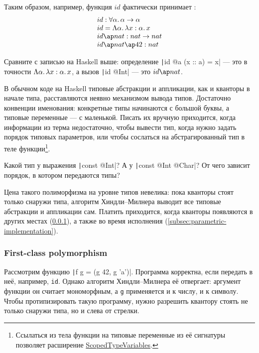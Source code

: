 Таким образом, например, функция $id$ фактически принимает :
\[
    \begin{array}{ll}
        id : \forall\alpha\ldotp\alpha\to\alpha            \\
        id = \Lambda\alpha\ldotp\lambda x : \alpha\ldotp x \\
        id \ap nat : nat \to nat                           \\
        id\ap nat \ap 42 : nat
    \end{array}
\]

Сравните с записью на Haskell выше: определение \texttt|id @a (x :: a) = x| --- это в точности $\Lambda\alpha\ldotp\lambda x : \alpha\ldotp x$, а вызов \texttt|id @Int| --- это $id\ap nat$.

В обычном коде на Haskell типовые абстракции и аппликации, как и кванторы в начале типа, расставляются неявно механизмом вывода типов.
Достаточно конвенции именования: конкретные типы начинаются с большой буквы, а типовые переменные --- с маленькой.
Писать их вручную приходится, когда информации из терма недостаточно, чтобы вывести тип, когда нужно задать порядок типовых параметров, или чтобы сослаться на абстрагированный тип в теле функции\footnote{Ссылаться из тела функции на типовые переменные из её сигнатуры позволяет расширение \href{https://downloads.haskell.org/ghc/latest/docs/users_guide/exts/scoped_type_variables.html\#extension-ScopedTypeVariables}{ScopedTypeVariables}.}.

\begin{task}
    Какой тип у выражения \texttt|const @Int|?
    А у \texttt|const @Int @Char|?
    От чего зависит порядок, в котором передаются типы?
\end{task}

Цена такого полиморфизма на уровне типов невелика: пока кванторы стоят только снаружи типа, алгоритм Хиндли--Милнера выводит все типовые абстракции и аппликации сам.
Платить приходится, когда кванторы появляются в других местах (\ref{subsubsec:first-class-polymorphism}), а также во время исполнения (\ref{subsec:parametric-implementation}).


\subsubsection{First-class polymorphism} \label{subsubsec:first-class-polymorphism}

Рассмотрим функцию \texttt|f g = (g 42, g 'a')|.
Программа корректна, если передать в неё, например, \texttt{id}.
Однако алгоритм Хиндли--Милнера её отвергает: аргумент функции он считает мономорфным, а \texttt{g} применяется и к числу, и к символу.
Чтобы протипизировать такую программу, нужно разрешить квантору стоять не только снаружи типа, но и слева от стрелки.

